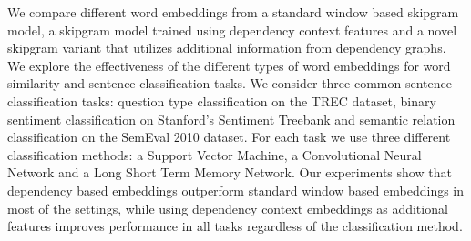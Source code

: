 We compare different word embeddings from a standard window based skipgram model, a skipgram model trained using dependency context features and a novel skipgram variant that utilizes additional information from dependency graphs. We explore the effectiveness of the different types of word embeddings for word similarity and sentence classification tasks. We consider three common sentence classification tasks: question type classification on the TREC dataset, binary sentiment classification on Stanford's Sentiment Treebank and semantic relation classification on the SemEval 2010 dataset. For each task we use three different classification methods: a Support Vector Machine, a Convolutional Neural Network and a Long Short Term Memory Network. Our experiments show that dependency based embeddings outperform standard window based embeddings in most of the settings, while using dependency context embeddings as additional features improves performance in all tasks regardless of the classification method.
